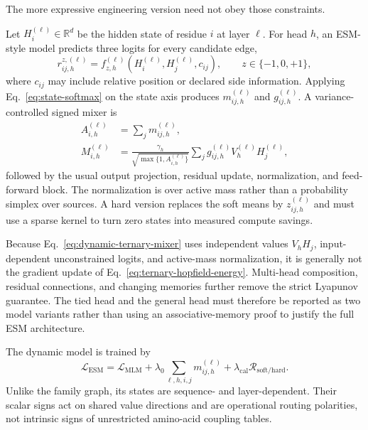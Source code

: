 \documentclass[10pt,twocolumn]{article}
\newcommand{\R}{\mathbb R}
\newcommand{\1}{\mathbf 1}
\theoremstyle{remark}
\begin{document}
The more expressive engineering version need not obey those constraints.

Let $H_i^{(\ell)}\in\R^d$ be the hidden state of residue $i$ at layer $\ell$.  For head $h$, an
ESM-style model \cite{rives2021} predicts three logits for every candidate edge,
\begin{equation}
r_{ij,h}^{z,(\ell)}
=f_{z,h}^{(\ell)}
\!\left(H_i^{(\ell)},H_j^{(\ell)},c_{ij}\right),
\qquad z\in\{-1,0,+1\},
\label{eq:dynamic-state-logits}
\end{equation}
where $c_{ij}$ may include relative position or declared side information.  Applying
Eq.~\ref{eq:state-softmax} on the state axis produces $m_{ij,h}^{(\ell)}$ and
$g_{ij,h}^{(\ell)}$.  A variance-controlled signed mixer is
\begin{align}
A_{i,h}^{(\ell)}
&=\sum_j m_{ij,h}^{(\ell)},\nonumber\\
M_{i,h}^{(\ell)}
&=\frac{\gamma_h}{\sqrt{\max\{1,A_{i,h}^{(\ell)}\}}}
\sum_j g_{ij,h}^{(\ell)}V_h^{(\ell)}H_j^{(\ell)},
\label{eq:dynamic-ternary-mixer}
\end{align}
followed by the usual output projection, residual update, normalization, and feed-forward block.
The normalization is over active mass rather than a probability simplex over sources.  A hard
version replaces the soft means by $z_{ij,h}^{(\ell)}$ and must use a sparse kernel to turn zero
states into measured compute savings.

Because Eq.~\ref{eq:dynamic-ternary-mixer} uses independent values $V_hH_j$, input-dependent
unconstrained logits, and active-mass normalization, it is generally not the gradient update of
Eq.~\ref{eq:ternary-hopfield-energy}.  Multi-head composition, residual connections, and changing
memories further remove the strict Lyapunov guarantee.  The tied head and the general head must
therefore be reported as two model variants rather than using an associative-memory proof to
justify the full ESM architecture.

The dynamic model is trained by
\begin{equation}
\mathcal L_{\mathrm{ESM}}
=\mathcal L_{\mathrm{MLM}}
+\lambda_0\sum_{\ell,h,i,j}m_{ij,h}^{(\ell)}
+\lambda_{\mathrm{cal}}\mathcal R_{\mathrm{soft/hard}}.
\label{eq:esm-objective}
\end{equation}
Unlike the family graph, its states are sequence- and layer-dependent.  Their scalar signs act on
shared value directions and are operational routing polarities, not intrinsic signs of unrestricted
amino-acid coupling tables.
\end{document}
